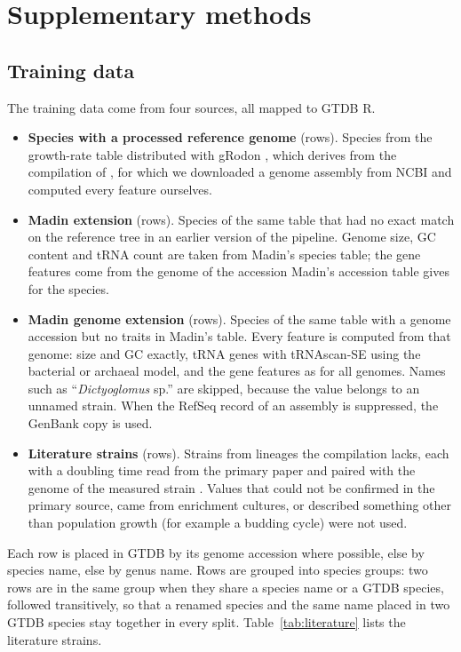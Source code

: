 \section{Supplementary methods}

\subsection{Training data}
The training data come from four sources, all mapped to GTDB R\GTDBRelease \citep{parks2022}.
\begin{itemize}
\item \textbf{Species with a processed reference genome} (\NOriginal rows). Species from the growth-rate table distributed
  with gRodon \citep{weissman2021}, which derives from the compilation of \citet{madin2020}, for which we downloaded a
  genome assembly from NCBI and computed every feature ourselves.
\item \textbf{Madin extension} (\NMadinExtension rows). Species of the same table that had no exact match on the reference
  tree in an earlier version of the pipeline. Genome size, GC content and tRNA count are taken from Madin's species
  table; the gene features come from the genome of the accession Madin's accession table gives for the species.
\item \textbf{Madin genome extension} (\NGenomeExtension rows). Species of the same table with a genome accession but no
  traits in Madin's table. Every feature is computed from that genome: size and GC exactly, tRNA genes with tRNAscan-SE
  \citep{chan2021} using the bacterial or archaeal model, and the gene features as for all genomes. Names such as
  ``\textit{Dictyoglomus} sp.'' are skipped, because the value belongs to an unnamed strain. When the RefSeq record of an
  assembly is suppressed, the GenBank copy is used.
\item \textbf{Literature strains} (\NLiterature rows). Strains from lineages the compilation lacks, each with a doubling
  time read from the primary paper and paired with the genome of the measured strain
  \citep{konneke2005,stieglmeier2014,palatinszky2015,nowka2015,mohammadi2017,lehtovirtamorley2014}. Values that could not
  be confirmed in the primary source, came from enrichment cultures, or described something other than population growth
  (for example a budding cycle) were not used.
\end{itemize}
Each row is placed in GTDB by its genome accession where possible, else by species name, else by genus name. Rows are
grouped into species groups: two rows are in the same group when they share a species name or a GTDB species, followed
transitively, so that a renamed species and the same name placed in two GTDB species stay together in every split.
Table~\ref{tab:literature} lists the literature strains.


